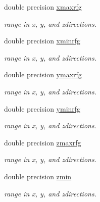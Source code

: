 \textbf{ }\par
\begin{DoxyCompactItemize}
\item 
double precision \mbox{\hyperlink{namespacedataclass_a32b5b26da65d1b3507a36c17029a18ae}{xmaxrfg}}
\begin{DoxyCompactList}\small\item\em range in x, y, and zdirections. \end{DoxyCompactList}\item 
double precision \mbox{\hyperlink{namespacedataclass_ab5b5b652fce1e93de12accd3514958a0}{xminrfg}}
\begin{DoxyCompactList}\small\item\em range in x, y, and zdirections. \end{DoxyCompactList}\item 
double precision \mbox{\hyperlink{namespacedataclass_a79212aa125148748cc4bd5a11fff492f}{ymaxrfg}}
\begin{DoxyCompactList}\small\item\em range in x, y, and zdirections. \end{DoxyCompactList}\item 
double precision \mbox{\hyperlink{namespacedataclass_a5393ad3032e6f0311c62d03d468a6cf0}{yminrfg}}
\begin{DoxyCompactList}\small\item\em range in x, y, and zdirections. \end{DoxyCompactList}\item 
double precision \mbox{\hyperlink{namespacedataclass_a52b6a1ee39c205fce4ef2be72ab153aa}{zmaxrfg}}
\begin{DoxyCompactList}\small\item\em range in x, y, and zdirections. \end{DoxyCompactList}\item 
double precision \mbox{\hyperlink{namespacedataclass_a9c2398fd87701d5c0de37ff6b3357a0c}{zmin}}
\begin{DoxyCompactList}\small\item\em range in x, y, and zdirections. \end{DoxyCompactList}\end{DoxyCompactItemize}

